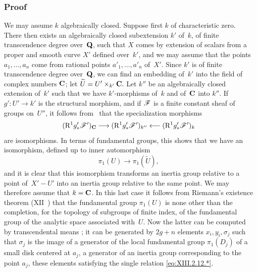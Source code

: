 \subsubsection*{Proof}
We may assume $k$ algebraically closed. Suppose first $k$ of
characteristic zero. There then exists an algebraically closed
subextension $k'$ of~$k$, of finite transcendence degree
over~$\mathbf{Q}$, such that $X$ comes by extension of scalars
from a proper and smooth curve $X'$ defined over~$k'$, and we may
assume that the points $a_1,\dots,a_n$ come from rational points
$a'_1,\dots,a'_n$ of~$X'$. Since $k'$ is of finite transcendence
degree over~$\mathbf{Q}$, we can find an embedding of~$k'$ into the field
of complex numbers $\mathbf{C}$; let $\widetilde{U}=U'\times_{k'}\mathbf{C}.$
Let $k''$ be an algebraically closed extension of~$k'$ such that
we have $k'$-morphisms of~$k$ and of~$\mathbf{C}$ into $k''$. If
$g'\colon U'\to k'$ is the structural morphism, and if
$\cal{F}$ is a finite constant sheaf of groups on~$U''$, it
follows from~ that the specialization morphisms
$$
(\R^1g'_*\cal{F}')_{\CC}\to(\R^1g'_*\cal{F}')_{k''}
\from(\R^1g'_*\cal{F}')_k
$$
are isomorphisms. In terms of fundamental groups, this shows
that we have an isomorphism, defined up to inner
automorphism
$$
\pi_1(U)\to\pi_1(\widetilde{U}),
$$
and it is clear that this isomorphism transforms an inertia group
relative to a point of~$X'-U'$ into an inertia group relative to the
same point. We may therefore assume that $k=\mathbf{C}$. In this
last case it follows from Riemann's existence theorem
(XII~) that the fundamental group $\pi_1(U)$ is none other
than the completion, for the topology of subgroups of finite
index, of the fundamental group of the analytic space associated with~$U$. Now the latter can be computed by transcendental means \cite[ch
\S 47]{XIII.3};
it can be generated by $2g+n$ elements $x_i,
y_i,\sigma_j$ such that $\sigma_j$ is the image of a generator
of the local fundamental group $\pi_1(D_j)$ of a small disk centered
at $a_j$, \ie a generator of an inertia group
corresponding to the point $a_j$, these elements satisfying
the single relation \eqref{eq:XIII.2.12.*}.

